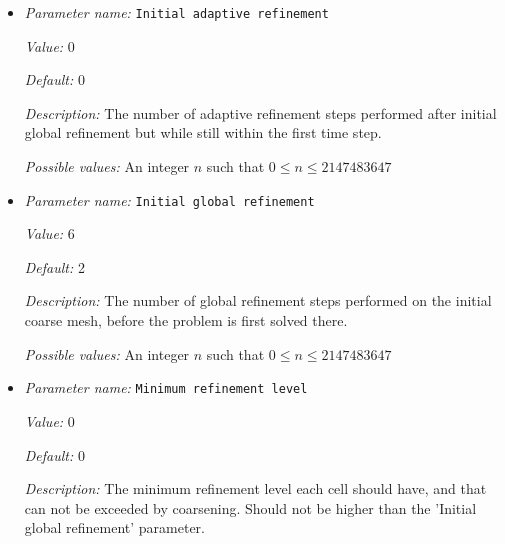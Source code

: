 \begin{itemize}
{\it Value:} 0.05


{\it Default:} 0.05


{\it Description:} The fraction of cells with the smallest error that should be flagged for coarsening.


{\it Possible values:} A floating point number $v$ such that $0 \leq v \leq 1$
\item {\it Parameter name:} {\tt Initial adaptive refinement}
\label{parameters:Mesh refinement/Initial adaptive refinement}
\label{parameters:Mesh_20refinement/Initial_20adaptive_20refinement}


{\it Value:} 0


{\it Default:} 0


{\it Description:} The number of adaptive refinement steps performed after initial global refinement but while still within the first time step.


{\it Possible values:} An integer $n$ such that $0\leq n \leq 2147483647$
\item {\it Parameter name:} {\tt Initial global refinement}
\label{parameters:Mesh refinement/Initial global refinement}
\label{parameters:Mesh_20refinement/Initial_20global_20refinement}


{\it Value:} 6


{\it Default:} 2


{\it Description:} The number of global refinement steps performed on the initial coarse mesh, before the problem is first solved there.


{\it Possible values:} An integer $n$ such that $0\leq n \leq 2147483647$
\item {\it Parameter name:} {\tt Minimum refinement level}
\label{parameters:Mesh refinement/Minimum refinement level}
\label{parameters:Mesh_20refinement/Minimum_20refinement_20level}


{\it Value:} 0


{\it Default:} 0


{\it Description:} The minimum refinement level each cell should have, and that can not be exceeded by coarsening. Should not be higher than the 'Initial global refinement' parameter.



\end{itemize}
